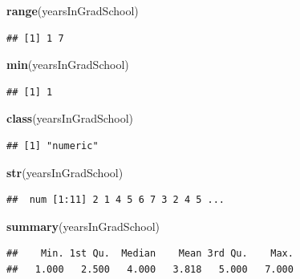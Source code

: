 \documentclass[]{book}
\newenvironment{Shaded}{\begin{snugshade}}{\end{snugshade}}
\newcommand{\KeywordTok}[1]{\textcolor[rgb]{0.13,0.29,0.53}{\textbf{#1}}}
\newcommand{\NormalTok}[1]{#1}
\theoremstyle{definition}
\theoremstyle{definition}
\theoremstyle{definition}
\theoremstyle{remark}
\begin{document}
\begin{Shaded}
\begin{Highlighting}[]
\KeywordTok{range}\NormalTok{(yearsInGradSchool)}
\end{Highlighting}
\end{Shaded}

\begin{verbatim}
## [1] 1 7
\end{verbatim}

\begin{Shaded}
\begin{Highlighting}[]
\KeywordTok{min}\NormalTok{(yearsInGradSchool)}
\end{Highlighting}
\end{Shaded}

\begin{verbatim}
## [1] 1
\end{verbatim}

\begin{Shaded}
\begin{Highlighting}[]
\KeywordTok{class}\NormalTok{(yearsInGradSchool)}
\end{Highlighting}
\end{Shaded}

\begin{verbatim}
## [1] "numeric"
\end{verbatim}

\begin{Shaded}
\begin{Highlighting}[]
\KeywordTok{str}\NormalTok{(yearsInGradSchool)}
\end{Highlighting}
\end{Shaded}

\begin{verbatim}
##  num [1:11] 2 1 4 5 6 7 3 2 4 5 ...
\end{verbatim}

\begin{Shaded}
\begin{Highlighting}[]
\KeywordTok{summary}\NormalTok{(yearsInGradSchool)}
\end{Highlighting}
\end{Shaded}

\begin{verbatim}
##    Min. 1st Qu.  Median    Mean 3rd Qu.    Max. 
##   1.000   2.500   4.000   3.818   5.000   7.000
\end{verbatim}
\end{document}
